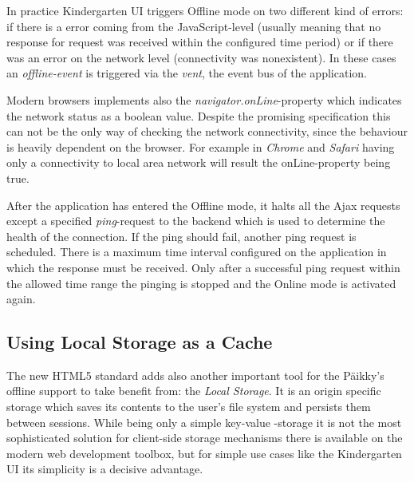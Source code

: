 In practice Kindergarten UI triggers Offline mode on two different kind of errors: if there is a error coming from the JavaScript-level (usually meaning that no response for request was received within the configured time period) or if there was an error on the network level (connectivity was nonexistent). In these cases an \textit{offline-event} is triggered via the \textit{vent}, the event bus of the application.

Modern browsers implements also the \textit{navigator.onLine}-property which indicates the network status as a boolean value. Despite the promising specification this can not be the only way of checking the network connectivity, since the behaviour is heavily dependent on the browser. For example in \textit{Chrome} and \textit{Safari} having only a connectivity to local area network will result the onLine-property being true. \cite{_window.navigator.online_????}

After the application has entered the Offline mode, it halts all the Ajax requests except a specified \textit{ping}-request to the backend which is used to determine the health of the connection. If the ping should fail, another ping request is scheduled. There is a maximum time interval configured on the application in which the response must be received. Only after a successful ping request within the allowed time range the pinging is stopped and the Online mode is activated again.





\subsection{Using Local Storage as a Cache}
\label{subsec:localstorage}

The new HTML5 standard adds also another important tool for the Päikky's offline support to take benefit from: the \textit{Local Storage}\cite{w3.org_web_????}. It is an origin specific storage which saves its contents to the user's file system and persists them between sessions. While being only a simple key-value -storage it is not the most sophisticated solution for client-side storage mechanisms there is available on the modern web development toolbox, but for simple use cases like the Kindergarten UI its simplicity is a decisive advantage.

